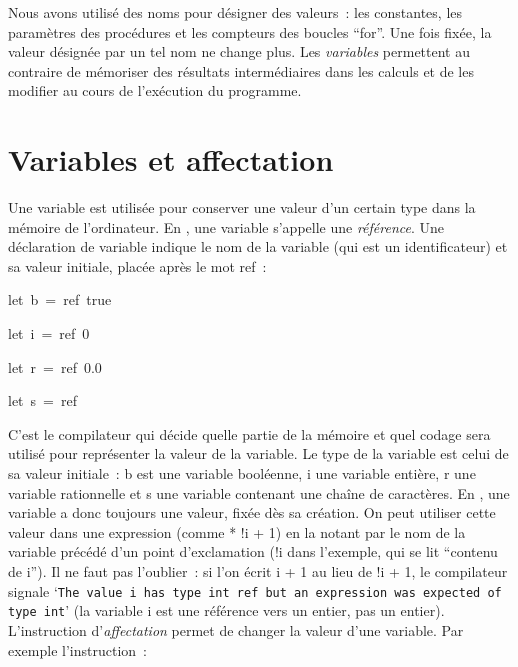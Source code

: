 Nous avons utilisé des noms pour désigner des valeurs~: les constantes, les paramètres des
procédures et les compteurs des boucles ``for''. Une fois fixée, la valeur désignée par un tel nom
ne change plus. Les {\em variables} permettent au contraire de mémoriser des résultats
intermédiaires dans les calculs et de les modifier au cours de l'exécution du programme.

\section{Variables et affectation}
Une variable est utilisée pour conserver une valeur d'un certain type dans la mémoire
de l'ordinateur. En \ocaml, une variable s'appelle une {\em référence}. Une déclaration de
variable indique le nom de la variable (qui est un identificateur)
et sa valeur initiale, placée après le mot {\idt ref}~:

\vspace{\neglskip}\mbox{\blc  \blk\idt  \mcl let\idt \ b\ =\ ref\ true}\par
\vspace{\neglskip}\mbox{\blc  \blk\idt  \mcl let\idt \ i\ =\ ref\ 0}\par
\vspace{\neglskip}\mbox{\blc  \blk\idt  \mcl let\idt \ r\ =\ ref\ 0.0}\par
\vspace{\neglskip}\mbox{\blc  \blk\idt  \mcl let\idt \ s\ =\ ref\ {\cha {}}}\par

\noindent C'est le compilateur qui décide quelle partie de la mémoire et quel codage sera utilisé pour
représenter la valeur de la variable. Le type de la variable est celui de sa valeur initiale~:
{\idt b} est une variable booléenne, {\idt i} une variable entière, {\idt r} une variable
rationnelle et {\idt s} une variable contenant une chaîne de caractères. En \ocaml, une variable
a donc toujours une valeur, fixée dès sa création. On peut utiliser cette valeur dans une
expression (comme { * !i + 1}) en la notant par le nom de la variable précédé d'un point
d'exclamation ({\idt !i} dans l'exemple, qui se lit ``contenu de {\idt i}''). Il ne faut pas
l'oublier~: si l'on écrit {\idt i + 1} au lieu de {\idt !i + 1}, le compilateur signale
`{\tt The value i has type int ref but an expression was expected of type int}' (la variable
{\idt i} est une référence vers un entier, pas un entier). L'instruction
d'{\em affectation\/} permet de changer la
valeur d'une variable. Par exemple l'instruction~:

